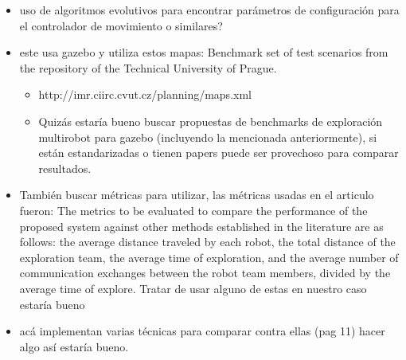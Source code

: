 \begin{itemize}
\item uso de algoritmos evolutivos para encontrar parámetros de configuración para el controlador de movimiento o similares?

\item este usa gazebo y utiliza estos mapas: Benchmark set of test scenarios from the repository of the Technical University of Prague.
\begin{itemize}
  \item http://imr.ciirc.cvut.cz/planning/maps.xml
  \item Quizás estaría bueno buscar propuestas de benchmarks de exploración multirobot para gazebo (incluyendo la mencionada anteriormente), si están estandarizadas o tienen papers puede ser provechoso para comparar resultados.
\end{itemize}

\item También buscar métricas para utilizar, las métricas usadas en el articulo fueron: The metrics to be evaluated to compare the performance of the proposed system against other methods established in the literature are as follows: the average distance traveled by each robot, the total distance of the exploration team, the average time of exploration, and the average number of communication exchanges between the robot team members, divided by the average time of explore. Tratar de usar alguno de estas en nuestro caso estaría bueno

\item acá implementan varias técnicas para comparar contra ellas (pag 11) hacer algo así estaría bueno.
\end{itemize}

